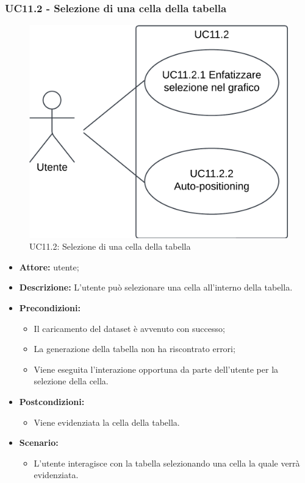 \subsubsection{UC11.2 - Selezione di una cella della tabella}
\begin{figure}[h!]\centering
    \includegraphics[scale=0.7]{template/images/UC11.2.png}
    \caption{UC11.2: Selezione di una cella della tabella}
\end{figure}
\begin{itemize}    
    \item \textbf{Attore:} utente;
    \item \textbf{Descrizione:} L'utente può selezionare una cella all'interno della tabella.
    \item \textbf{Precondizioni:}    
        \begin{itemize}
            \item Il caricamento del dataset è avvenuto con successo;
            \item La generazione della tabella non ha riscontrato errori;
            \item Viene eseguita l'interazione opportuna da parte dell'utente per la selezione della cella.
        \end{itemize}    
    \item \textbf{Postcondizioni:}
        \begin{itemize}
            \item Viene evidenziata la cella della tabella.
        \end{itemize}    
    \item \textbf{Scenario:} 
        \begin{itemize}
            \item L'utente interagisce con la tabella selezionando una cella la quale verrà evidenziata.
        \end{itemize}
\end{itemize}
